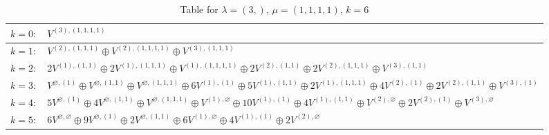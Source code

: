 \documentclass[a4paper,12pt]{article}
\begin{document}
\renewcommand{\arraystretch}{1.6} 
\begin{table}[H]
\centering
\caption{Table for $\lambda = (3,)$, $\mu = (1, 1, 1, 1)$, $k = 6$}
\begin{tabular}{|>{\centering\arraybackslash}p{15cm}|}
\hline
 $k = 0: \quad V^{(3), (1, 1, 1, 1)} $ \\ \hline
 $k = 1: \quad V^{(2), (1, 1, 1)} \oplus V^{(2), (1, 1, 1, 1)} \oplus V^{(3), (1, 1, 1)} $ \\ \hline
 $k = 2: \quad 2 V^{(1), (1, 1)} \oplus 2 V^{(1), (1, 1, 1)} \oplus V^{(1), (1, 1, 1, 1)} \oplus 2 V^{(2), (1, 1)} \oplus 2 V^{(2), (1, 1, 1)} \oplus V^{(3), (1, 1)} $ \\ \hline
 $k = 3: \quad V^{\varnothing, (1)} \oplus V^{\varnothing, (1, 1)} \oplus V^{\varnothing, (1, 1, 1)} \oplus 6 V^{(1), (1)} \oplus 5 V^{(1), (1, 1)} \oplus 2 V^{(1), (1, 1, 1)} \oplus 4 V^{(2), (1)} \oplus 2 V^{(2), (1, 1)} \oplus V^{(3), (1)} $ \\ \hline
 $k = 4: \quad 5 V^{\varnothing, (1)} \oplus 4 V^{\varnothing, (1, 1)} \oplus V^{\varnothing, (1, 1, 1)} \oplus V^{(1), \varnothing} \oplus 10 V^{(1), (1)} \oplus 4 V^{(1), (1, 1)} \oplus V^{(2), \varnothing} \oplus 2 V^{(2), (1)} \oplus V^{(3), \varnothing} $ \\ \hline
 $k = 5: \quad 6 V^{\varnothing, \varnothing} \oplus 9 V^{\varnothing, (1)} \oplus 2 V^{\varnothing, (1, 1)} \oplus 6 V^{(1), \varnothing} \oplus 4 V^{(1), (1)} \oplus 2 V^{(2), \varnothing} $ \\ \hline
\end{tabular}
\end{table}
\end{document}
